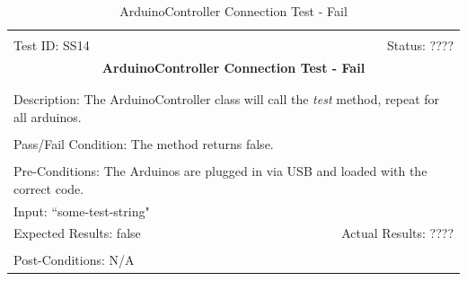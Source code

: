 \documentclass[11pt]{article}
\begin{document}
\begin{center}
\begin{table}[H]
\begin{tabular}{|l r|}\hline&\\[-2mm]
	Test ID: SS14	&Status: ????\\[-3mm]
	\multicolumn{2}{|c|}{\textbf{\large{ArduinoController Connection Test - Fail}}}\\&\\\hline&\\[-3mm]
	\multicolumn{2}{|p{\textwidth}|}{Description: The ArduinoController class will call the \textit{test} method, repeat for all arduinos.}\\[1mm]\hline&\\[-3mm]
	\multicolumn{2}{|p{\textwidth}|}{Pass/Fail Condition: The method returns false.}\\[1mm]\hline&\\[-3mm]
	\multicolumn{2}{|p{\textwidth}|}{Pre-Conditions: The Arduinos are plugged in via USB and loaded with the correct code.}\\[4mm]
	\multicolumn{2}{|p{\textwidth}|}{Input: ``some-test-string"}\\[2mm]\hline
	\multicolumn{1}{|p{0.49\textwidth}}{Expected Results: false}	&\multicolumn{1}{|p{0.45\textwidth}|}{Actual Results: ????}\\\hline&\\[-3mm]
	\multicolumn{2}{|p{\textwidth}|}{Post-Conditions: N/A}\\\hline
\end{tabular}
\caption{ArduinoController Connection Test - Fail}
\end{table}
\end{center}
\end{document}
